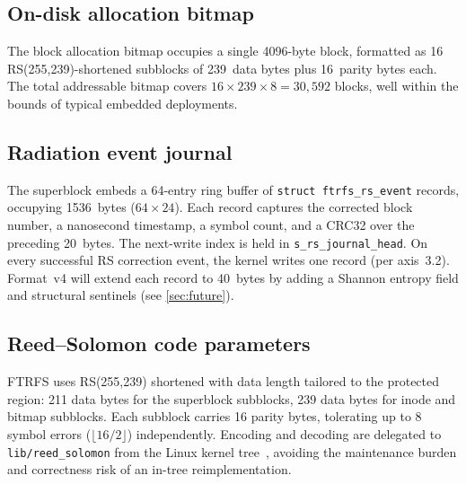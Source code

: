 \subsection{On-disk allocation bitmap}

The block allocation bitmap occupies a single 4096-byte block,
formatted as 16 RS(255,239)-shortened subblocks of 239~data bytes
plus 16~parity bytes each. The total addressable bitmap covers
$16 \times 239 \times 8 = 30{,}592$ blocks, well within the bounds
of typical embedded deployments.

\subsection{Radiation event journal}

The superblock embeds a 64-entry ring buffer of
\texttt{struct ftrfs\_rs\_event} records, occupying 1536~bytes
($64 \times 24$). Each record captures the corrected block number,
a nanosecond timestamp, a symbol count, and a CRC32 over the
preceding 20~bytes. The next-write index is held in
\texttt{s\_rs\_journal\_head}. On every successful RS correction
event, the kernel writes one record (per axis~3.2). Format~v4 will
extend each record to 40~bytes by adding a Shannon entropy field
and structural sentinels (see \cref{sec:future}).

\subsection{Reed--Solomon code parameters}

FTRFS uses RS(255,239) shortened with data length tailored to the
protected region: 211 data bytes for the superblock subblocks,
239 data bytes for inode and bitmap subblocks. Each subblock
carries 16 parity bytes, tolerating up to 8 symbol errors
($\lfloor 16/2 \rfloor$) independently. Encoding and decoding are
delegated to \texttt{lib/reed\_solomon} from the Linux kernel
tree~\cite{kernelrslib}, avoiding the maintenance burden and
correctness risk of an in-tree reimplementation.
